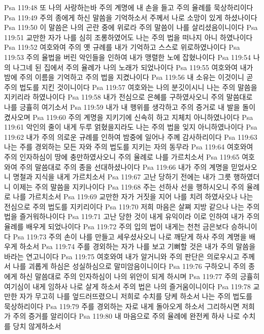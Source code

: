 Psa 119:48  또 나의 사랑하는바 주의 계명에 내 손을 들고 주의 율례를 묵상하리이다
Psa 119:49  주의 종에게 하신 말씀을 기억하소서 주께서 나로 소망이 있게 하셨나이다
Psa 119:50  이 말씀은 나의 곤란 중에 위로라 주의 말씀이 나를 살리셨음이니이다
Psa 119:51  교만한 자가 나를 심히 조롱하였어도 나는 주의 법을 떠나지 아니 하였나이다
Psa 119:52  여호와여 주의 옛 규례를 내가 기억하고 스스로 위로하였나이다
Psa 119:53  주의 율법을 버린 악인들을 인하여 내가 맹렬한 노에 잡혔나이다
Psa 119:54  나의 나그네 된 집에서 주의 율례가 나의 노래가 되었나이다
Psa 119:55  여호와여 내가 밤에 주의 이름을 기억하고 주의 법을 지켰나이다
Psa 119:56  내 소유는 이것이니 곧 주의 법도를 지킨 것이니이다
Psa 119:57  여호와는 나의 분깃이시니 나는 주의 말씀을 지키리라 하였나이다
Psa 119:58  내가 전심으로 은혜를 구하였사오니 주의 말씀대로 나를 긍휼히 여기소서
Psa 119:59  내가 내 행위를 생각하고 주의 증거로 내 발을 돌이켰사오며
Psa 119:60  주의 계명을 지키기에 신속히 하고 지체치 아니하였나이다
Psa 119:61  악인의 줄이 내게 두루 얽혔을지라도 나는 주의 법을 잊지 아니하였나이다
Psa 119:62  내가 주의 의로운 규례를 인하여 밤중에 일어나 주께 감사하리이다
Psa 119:63  나는 주를 경외하는 모든 자와 주의 법도를 지키는 자의 동무라
Psa 119:64  여호와여 주의 인자하심이 땅에 충만하였사오니 주의 율례로 나를 가르치소서
Psa 119:65  여호와여 주의 말씀대로 주의 종을 선대하셨나이다
Psa 119:66  내가 주의 계명을 믿었사오니 명철과 지식을 내게 가르치소서
Psa 119:67  고난 당하기 전에는 내가 그릇 행하였더니 이제는 주의 말씀을 지키나이다
Psa 119:68  주는 선하사 선을 행하시오니 주의 율례로 나를 가르치소서
Psa 119:69  교만한 자가 거짓을 지어 나를 치려 하였사오나 나는 전심으로 주의 법도를 지키리이다
Psa 119:70  저희 마음은 살쪄 지방 같으나 나는 주의 법을 즐거워하나이다
Psa 119:71  고난 당한 것이 내게 유익이라 이로 인하여 내가 주의 율례를 배우게 되었나이다
Psa 119:72  주의 입의 법이 내게는 천천 금은보다 승하니이다
Psa 119:73  주의 손이 나를 만들고 세우셨사오니 나로 깨닫게 하사 주의 계명을 배우게 하소서
Psa 119:74  주를 경외하는 자가 나를 보고 기뻐할 것은 내가 주의 말씀을 바라는 연고니이다
Psa 119:75  여호와여 내가 알거니와 주의 판단은 의로우시고 주께서 나를 괴롭게 하심은 성실하심으로 말미암음이니이다
Psa 119:76  구하오니 주의 종에게 하신 말씀대로 주의 인자하심이 나의 위안이 되게 하시며
Psa 119:77  주의 긍휼히 여기심이 내게 임하사 나로 살게 하소서 주의 법은 나의 즐거움이니이다
Psa 119:78  교만한 자가 무고히 나를 엎드러뜨렸으니 저희로 수치를 당케 하소서 나는 주의 법도를 묵상하리이다
Psa 119:79  주를 경외하는 자로 내게 돌아오게 하소서 그리하시면 저희가 주의 증거를 알리이다
Psa 119:80  내 마음으로 주의 율례에 완전케 하사 나로 수치를 당치 않게하소서
